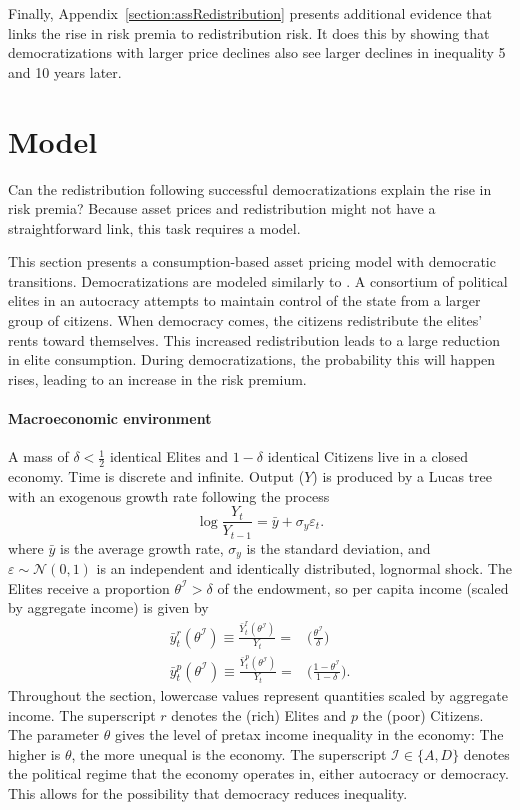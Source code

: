 \documentclass[12pt]{article}
\numberwithin{equation}{section}
\begin{document}
Finally, Appendix~\ref{section:assRedistribution} presents additional evidence that links the rise in risk premia to redistribution risk. It does this by showing that democratizations with larger price declines also see larger declines in inequality 5 and 10 years later.


\section{Model}\label{section:model}
Can the redistribution following successful democratizations explain the rise in risk premia? Because asset prices and redistribution might not have a straightforward link, this task requires a model.

This section presents a consumption-based asset pricing model with democratic transitions. Democratizations are modeled similarly to \cite{Acemoglu2006}.  A consortium of political elites in an autocracy attempts to maintain control of the state from a larger group of citizens. When democracy comes, the citizens redistribute the elites' rents toward themselves. This increased redistribution leads to a large reduction in elite consumption. During democratizations, the probability this will happen rises, leading to an increase in the risk premium.

\paragraph{Macroeconomic environment}
A mass of $\delta<\frac{1}{2}$ identical Elites and $1-\delta$ identical Citizens live in a closed economy.  Time is discrete and infinite.  Output ($Y$) is produced by a Lucas tree with an exogenous growth rate following the process
\begin{equation}
\log \frac{Y_{t}}{Y_{t-1}}=\bar{y}+\sigma_y \varepsilon_{t}.\label{eq:endowment}
\end{equation}
where $\bar{y}$ is the average growth rate, $\sigma_y$ is the standard deviation, and $\varepsilon \sim \mathcal{N}(0,1)$ is an independent and identically distributed, lognormal shock.  The Elites receive a proportion $\theta^\mathcal{I}>\delta$ of the endowment, so per capita income (scaled by aggregate income) is given by
\begin{align}
\bar{y}_{t}^{r}(\theta^{\mathcal{I}}) \equiv \frac{\bar{Y}_{t}^{r}(\theta^{\mathcal{I}})}{Y_t}= & \bigg(\frac{\theta^\mathcal{I}}{\delta}\bigg) \\
\bar{y}_{t}^{p}(\theta^{\mathcal{I}}) \equiv \frac{\bar{Y}_{t}^{p}(\theta^{\mathcal{I}})}{Y_t}= & \bigg(\frac{1-\theta^\mathcal{I}}{1-\delta}\bigg).
\end{align}
Throughout the section, lowercase values represent quantities scaled by aggregate income. The superscript $r$ denotes the (rich) Elites and $p$ the (poor) Citizens. The parameter $\theta$ gives the level of pretax income inequality in the economy: The higher is $\theta$, the more unequal is the economy.  The superscript $\mathcal{I} \in \{A,D\}$ denotes the political regime that the economy operates in,  either autocracy or democracy.  This allows for the possibility that democracy reduces inequality.
\end{document}
